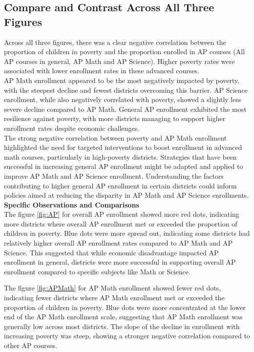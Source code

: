 \documentclass[sn-mathphys-num]{sn-jnl}%
\theoremstyle{thmstyleone}%
\theoremstyle{thmstyletwo}%
\theoremstyle{thmstylethree}%
\begin{document}
{\subsection{Compare and Contrast Across All Three Figures}

Across all three figures, there was a clear negative correlation between the proportion of children in poverty and the proportion enrolled in AP courses (All AP courses in general, AP Math and AP Science). Higher poverty rates were associated with lower enrollment rates in these advanced courses.\\

AP Math enrollment appeared to be the most negatively impacted by poverty, with the steepest decline and fewest districts overcoming this barrier. AP Science enrollment, while also negatively correlated with poverty, showed a slightly less severe decline compared to AP Math. General AP enrollment exhibited the most resilience against poverty, with more districts managing to support higher enrollment rates despite economic challenges.\\

The strong negative correlation between poverty and AP Math enrollment highlighted the need for targeted interventions to boost enrollment in advanced math courses, particularly in high-poverty districts. Strategies that have been successful in increasing general AP enrollment might be adapted and applied to improve AP Math and AP Science enrollment. Understanding the factors contributing to higher general AP enrollment in certain districts could inform policies aimed at reducing the disparity in AP Math and AP Science enrollments.\\

\textbf{Specific Observations and Comparisons}\\

The figure \ref{fig:AP} for overall AP enrollment showed more red dots, indicating more districts where overall AP enrollment met or exceeded the proportion of children in poverty. Blue dots were more spread out, indicating some districts had relatively higher overall AP enrollment rates compared to AP Math and AP Science. This suggested that while economic disadvantage impacted AP enrollment in general, districts were more successful in supporting overall AP enrollment compared to specific subjects like Math or Science.

The figure \ref{fig:APMath} for AP Math enrollment showed fewer red dots, indicating fewer districts where AP Math enrollment met or exceeded the proportion of children in poverty. Blue dots were more concentrated at the lower end of the AP Math enrollment scale, suggesting that AP Math enrollment was generally low across most districts. The slope of the decline in enrollment with increasing poverty was steep, showing a stronger negative correlation compared to other AP courses.\\

}
\end{document}
